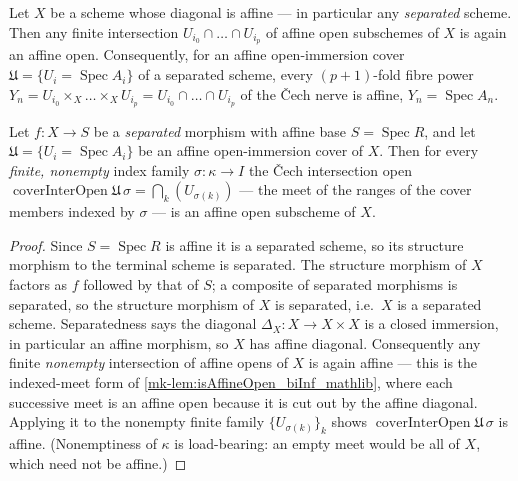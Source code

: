 \begin{lemma}
  \label{mk-lem:isAffineOpen_biInf_mathlib}
  \mathlibok

  Let \(X\) be a scheme whose diagonal is affine --- in particular any \emph{separated}
  scheme. Then any finite
  intersection \(U_{i_0} \cap \dots \cap U_{i_p}\) of affine open subschemes of \(X\) is
  again an affine open. Consequently, for an affine open-immersion cover
  \(\mathfrak{U} = \{U_i = \operatorname{Spec} A_i\}\) of a separated scheme, every
  \((p+1)\)-fold fibre power \(Y_n = U_{i_0} \times_X \dots \times_X U_{i_p} =
  U_{i_0} \cap \dots \cap U_{i_p}\) of the {\v C}ech nerve is affine,
  \(Y_n = \operatorname{Spec} A_n\).
\end{lemma}

\begin{lemma}\label{mk-lem:cech_interopen_isaffine}
  \leanok

  Let \(f : X \to S\) be a \emph{separated} morphism with affine base
  \(S = \operatorname{Spec} R\), and let \(\mathfrak{U} = \{U_i = \operatorname{Spec} A_i\}\)
  be an affine open-immersion cover of \(X\). Then for every \emph{finite, nonempty} index
  family \(\sigma : \kappa \to I\) the {\v C}ech intersection open
  \(\operatorname{coverInterOpen}\mathfrak{U}\,\sigma = \bigcap_k (U_{\sigma(k)})\) --- the
  meet of the ranges of the cover members indexed by \(\sigma\) --- is an affine open
  subscheme of \(X\).
\end{lemma}
\begin{proof}
  Since \(S = \operatorname{Spec} R\) is affine it is a separated scheme, so its structure
  morphism to the terminal scheme is separated. The structure morphism of \(X\) factors as
  \(f\) followed by that of \(S\); a composite of separated morphisms is separated, so the
  structure morphism of \(X\) is separated, i.e.\ \(X\) is a separated scheme. Separatedness
  says the diagonal \(\Delta_X : X \to X \times X\) is a closed immersion, in particular an
  affine morphism, so \(X\) has affine diagonal. Consequently any finite \emph{nonempty}
  intersection of affine opens of \(X\) is again affine --- this is the indexed-meet form of
  \ref{mk-lem:isAffineOpen_biInf_mathlib}, where each successive meet is an affine open because
  it is cut out by the affine diagonal. Applying it to the nonempty finite family
  \(\{U_{\sigma(k)}\}_k\) shows \(\operatorname{coverInterOpen}\mathfrak{U}\,\sigma\) is
  affine. (Nonemptiness of \(\kappa\) is load-bearing: an empty meet would be all of \(X\),
  which need not be affine.)
\end{proof}

